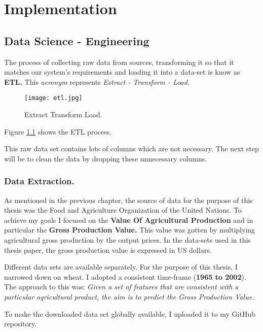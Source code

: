 \documentclass[
]{thesis-ekf}
\begin{document}
\chapter{Implementation}
\section{Data Science - Engineering}

The process of collecting raw data from sources, transforming it so that it matches our system's requirements and loading it into a data-set is know as \textbf{ETL.} This \textit{acronym} represents \textit{Extract - Transform - Load.}

\begin{figure}[h!]
	\texttt{[image: etl.jpg]}
	\caption{Extract Transform Load.}
	\label{fig:ETL}
\end{figure}

Figure \ref{fig:ETL} shows the ETL process.


This raw data set contains lots of columns which are not necessary. The next step will be to clean the data by dropping these unnecessary columns. 


\subsection{Data Extraction.}

As mentioned in the previous chapter, the source of data for the purpose of this thesis was the Food and Agriculture Organization of the United Nations. To achieve my goals I focused on the \textbf{Value Of Agricultural Production} and in particular the \textbf{Gross Production Value.} This value was gotten by multiplying agricultural gross production by the output prices. In the data-sets used in this thesis paper, the gross production value is expressed in US dollars. 


Different data sets are available separately. For the purpose of this thesis, I narrowed down on wheat. I adopted a consistent time-frame (\textbf{1965 to 2002}). The approach to this was: \textit{Given a set of features that are consistent with a particular agricultural product, the aim is to predict the Gross Production Value.}

To make the downloaded data set globally available, I uploaded it to my GitHub repository.\cite{adeyemo_2020}
\end{document}
